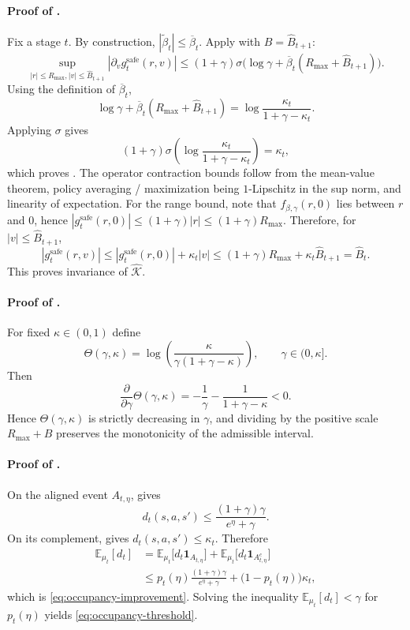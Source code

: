 \documentclass{article}
\theoremstyle{remark}
\newcommand{\E}{\mathbb{E}}
\newcommand{\safe}{\mathrm{safe}}
\newcommand{\Ksafe}{\widehat{\mathcal K}}
\newcommand{\betacap}{\overline\beta}
\newcommand{\Bhat}{\widehat B}
\begin{document}
\paragraph{Proof of .}
Fix a stage $t$.
By construction, $|\widetilde\beta_t|\le \betacap_t$.
Apply  with $B=\Bhat_{t+1}$:
\[
\sup_{|r|\le R_{\max},|v|\le \Bhat_{t+1}}\left|\partial_v g_t^{\safe}(r,v)\right|
\le (1+\gamma)\sigma\!\bigl(\log\gamma + \betacap_t(R_{\max}+\Bhat_{t+1})\bigr).
\]
Using the definition of $\betacap_t$,
\[
\log\gamma + \betacap_t(R_{\max}+\Bhat_{t+1})=\log\frac{\kappa_t}{1+\gamma-\kappa_t}.
\]
Applying $\sigma$ gives
\[
(1+\gamma)\sigma\!\left(\log\frac{\kappa_t}{1+\gamma-\kappa_t}\right)=\kappa_t,
\]
which proves .
The operator contraction bounds follow from the mean-value theorem, policy averaging / maximization being $1$-Lipschitz in the sup norm, and linearity of expectation.
For the range bound, note that $f_{\beta,\gamma}(r,0)$ lies between $r$ and $0$, hence $|g_t^{\safe}(r,0)|\le (1+\gamma)|r|\le (1+\gamma)R_{\max}$.
Therefore, for $|v|\le \Bhat_{t+1}$,
\[
|g_t^{\safe}(r,v)|\le |g_t^{\safe}(r,0)| + \kappa_t|v|\le (1+\gamma)R_{\max}+\kappa_t\Bhat_{t+1}=\Bhat_t.
\]
This proves invariance of $\Ksafe$.

\paragraph{Proof of .}
For fixed $\kappa\in(0,1)$ define
\[
\Theta(\gamma,\kappa)=\log\!\left(\frac{\kappa}{\gamma(1+\gamma-\kappa)}\right),
\qquad \gamma\in(0,\kappa].
\]
Then
\[
\frac{\partial}{\partial \gamma}\Theta(\gamma,\kappa)
=-\frac{1}{\gamma}-\frac{1}{1+\gamma-\kappa}<0.
\]
Hence $\Theta(\gamma,\kappa)$ is strictly decreasing in $\gamma$, and dividing by the positive scale $R_{\max}+B$ preserves the monotonicity of the admissible interval.

\paragraph{Proof of .}
On the aligned event $A_{t,\eta}$,  gives
\[
d_t(s,a,s')\le \frac{(1+\gamma)\gamma}{e^{\eta}+\gamma}.
\]
On its complement,  gives $d_t(s,a,s')\le \kappa_t$. Therefore
\begin{align*}
\E_{\mu_t}[d_t]
&=\E_{\mu_t}\bigl[d_t\mathbf 1_{A_{t,\eta}}\bigr]+\E_{\mu_t}\bigl[d_t\mathbf 1_{A_{t,\eta}^c}\bigr]\\
&\le p_t(\eta)\frac{(1+\gamma)\gamma}{e^{\eta}+\gamma} + \bigl(1-p_t(\eta)\bigr)\kappa_t,
\end{align*}
which is \eqref{eq:occupancy-improvement}. Solving the inequality $\E_{\mu_t}[d_t]<\gamma$ for $p_t(\eta)$ yields \eqref{eq:occupancy-threshold}.
\end{document}

